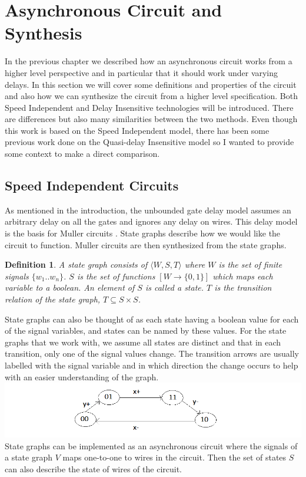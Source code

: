 \documentclass[12pt]{report}
\newtheorem*{definition}{Definition}
\begin{document}
\section{Asynchronous Circuit and Synthesis}
In the previous chapter we described how an asynchronous circuit works from a higher level perspective and in particular that it should work under varying delays.  In this section we will cover some definitions and properties of the circuit and also how we can synthesize the circuit from a higher level specification.  Both Speed Independent and Delay Insensitive technologies will be introduced.  There are differences but also many similarities between the two methods.  Even though this work is based on the Speed Independent model, there has been some previous work done on the Quasi-delay Insensitive model so I wanted to provide some context to make a direct comparison.

\subsection{Speed Independent Circuits}
As mentioned in the introduction, the unbounded gate delay model assumes an arbitrary delay on all the gates and ignores any delay on wires.  This delay model is the basis for Muller circuits \cite{Muller_59}.  State graphs describe how we would like the circuit to function.  
Muller circuits are then synthesized from the state graphs.
\begin{definition}A state graph consists of $\langle W, S, T\rangle$ where $W$ is the set of finite signals $\{w_1 .. w_n\}$.  $S$ is the set of functions $[W \to \{0,1\}]$ %
which maps each variable to a boolean.  An element of $S$ is called a {\em state}. $T$ is the transition relation of the state graph, $T \subseteq S \times S$.  \end{definition}

State graphs can also be thought of as each state having a boolean value for each of the signal variables, and states can be named by these values.  For the state graphs that we work with, we assume all states are distinct and that in each transition, only one of the signal values change.  The transition arrows are usually labelled with the signal variable and in which direction the change occurs to help with an easier understanding of the graph. 
\includegraphics[width=\textwidth]{stategraphex}
State graphs can be implemented as an asynchronous circuit where the signals of a state graph $V$ maps one-to-one to wires in the circuit.  Then the set of states $S$ can also describe the state of wires of the circuit.  \\
\end{document}
